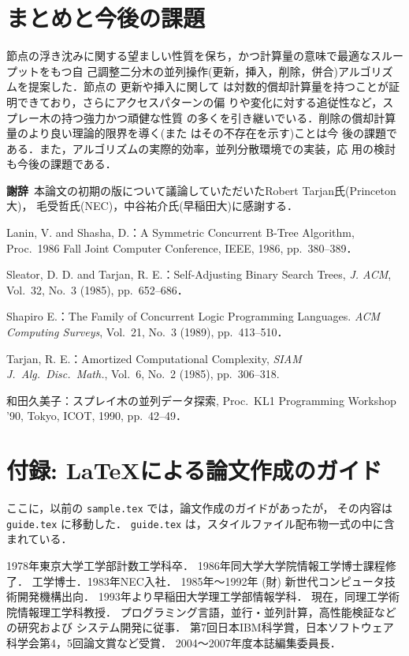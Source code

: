 \documentclass{compsoft}
\begin{document}
\section{まとめと今後の課題}

節点の浮き沈みに関する望ましい性質を保ち，かつ計算量の意味で最適なスルー
プットをもつ自
己調整二分木の並列操作(更新，挿入，削除，併合)アルゴリズムを提案した．節点の
更新や挿入に関して
は対数的償却計算量を持つことが証明できており，さらにアクセスパターンの偏
りや変化に対する追従性など，スプレー木の持つ強力かつ頑健な性質
の多くを引き継いでいる．削除の償却計算量のより良い理論的限界を導く(また
はその不存在を示す)ことは今
後の課題である．また，アルゴリズムの実際的効率，並列分散環境での実装，応
用の検討も今後の課題である．


{\bf 謝辞}\
本論文の初期の版について議論していただいたRobert Tarjan氏(Princeton大)，
毛受哲氏(NEC)，中谷祐介氏(早稲田大)に感謝する．
%
\begin{adjustvboxheight} %
\begin{thebibliography}{99}
 Lanin, V. and Shasha, D.：A Symmetric Concurrent B-Tree
Algorithm,
Proc.\ 1986 Fall Joint Computer Conference, IEEE, 1986, pp.~380--389．

 Sleator, D. D. and Tarjan, R. E.：Self-Adjusting Binary Search
Trees, {\it J. ACM}, Vol.~32, No.~3 (1985), pp.~652--686．

 Shapiro E.：The Family of Concurrent Logic Programming Languages.
{\it ACM Computing Surveys}, Vol.~21, No.~3 (1989), pp.~413--510．

 Tarjan, R. E.：Amortized Computational Complexity, {\it
SIAM J.\ Alg.\ Disc.\ Math.}, Vol.~6, No.~2 (1985), pp.~306--318.

 和田久美子：スプレイ木の並列データ探索, Proc.\ KL1
Programming Workshop '90, Tokyo, ICOT, 1990, pp.~42--49．
\end{thebibliography}
\end{adjustvboxheight} %

\appendix
\section{付録: \LaTeX による論文作成のガイド} 

ここに，以前の \verb|sample.tex| では，論文作成のガイドがあったが，
その内容は \verb|guide.tex| に移動した．
\verb|guide.tex| は，スタイルファイル配布物一式の中に含まれている．

\begin{choshashoukai}

{1978年東京大学工学部計数工学科卒．
1986年同大学大学院情報工学博士課程修了．
工学博士．1983年NEC入社．
1985年〜1992年 (財) 新世代コンピュータ技術開発機構出向．
1993年より早稲田大学理工学部情報学科．
現在，同理工学術院情報理工学科教授．
プログラミング言語，並行・並列計算，高性能検証などの研究および
システム開発に従事．
第7回日本IBM科学賞，日本ソフトウェア科学会第4，5回論文賞など受賞．
2004〜2007年度本誌編集委員長．}

\end{choshashoukai}
\end{document}
